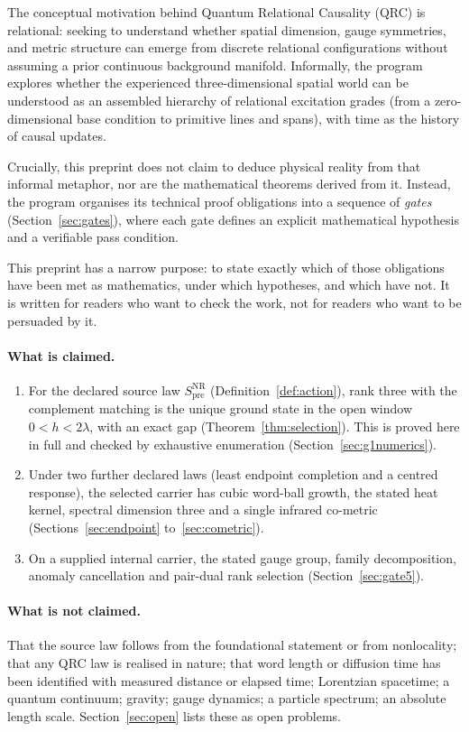 \documentclass[11pt]{article}
\theoremstyle{definition}
\theoremstyle{remark}
\newcommand{\Spre}{S^{\mathrm{NR}}_{\mathrm{pre}}}
\begin{document}
The conceptual motivation behind Quantum Relational Causality (QRC) is relational:
seeking to understand whether spatial dimension, gauge symmetries, and metric structure
can emerge from discrete relational configurations without assuming a prior continuous
background manifold. Informally, the program explores whether the experienced
three-dimensional spatial world can be understood as an assembled hierarchy of relational
excitation grades (from a zero-dimensional base condition to primitive lines and spans),
with time as the history of causal updates.

Crucially, this preprint does not claim to deduce physical reality from that informal
metaphor, nor are the mathematical theorems derived from it. Instead, the program
organises its technical proof obligations into a sequence of \emph{gates}
(Section~\ref{sec:gates}), where each gate defines an explicit mathematical hypothesis and
a verifiable pass condition.

This preprint has a narrow purpose: to state exactly which of those obligations have
been met as mathematics, under which hypotheses, and which have not. It is written for
readers who want to check the work, not for readers who want to be persuaded by it.

\paragraph{What is claimed.}
\begin{enumerate}
\item For the declared source law $\Spre$ (Definition~\ref{def:action}), rank three with
  the complement matching is the unique ground state in the open window $0<h<2\lambda$,
  with an exact gap (Theorem~\ref{thm:selection}). This is proved here in full and checked
  by exhaustive enumeration (Section~\ref{sec:g1numerics}).
\item Under two further declared laws (least endpoint completion and a centred response),
  the selected carrier has cubic word-ball growth, the stated heat kernel, spectral
  dimension three and a single infrared co-metric (Sections~\ref{sec:endpoint}
  to~\ref{sec:cometric}).
\item On a supplied internal carrier, the stated gauge group, family decomposition,
  anomaly cancellation and pair-dual rank selection (Section~\ref{sec:gate5}).
\end{enumerate}

\paragraph{What is not claimed.} That the source law follows from the foundational
statement or from nonlocality; that any QRC law is realised in nature; that word length
or diffusion time has been identified with measured distance or elapsed time; Lorentzian
spacetime; a quantum continuum; gravity; gauge dynamics; a particle spectrum; an absolute
length scale. Section~\ref{sec:open} lists these as open problems.
\end{document}
